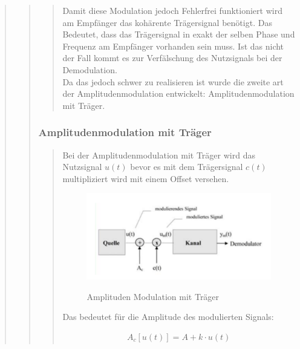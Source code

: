 \begin{quote}
\begin{quote}
\begin{quote}
             Damit diese Modulation jedoch Fehlerfrei funktioniert wird am Empfänger das kohärente Trägersignal
             benötigt. Das Bedeutet, dass das Trägersignal in exakt der selben Phase und Frequenz am Empfänger vorhanden
             sein muss. Ist das nicht der Fall kommt es zur Verfälschung des Nutzsignals bei der Demodulation.\\
             Da das jedoch schwer zu realisieren ist wurde die zweite art der Amplitudenmodulation entwickelt:
             Amplitudenmodulation mit Träger.
             
            
		\end{quote}
		
		\subsubsection{Amplitudenmodulation mit Träger}
		\begin{quote}
			Bei der Amplitudenmodulation mit Träger wird das Nutzsignal $u(t)$ bevor es mit dem Trägersignal $c(t)$
			multipliziert wird mit einem Offset versehen.
			
			\begin{figure}[H]
            \centering
                \includegraphics[scale=0.7, trim = 0cm 0cm 0cm 0cm, clip]{./Bilder/AMmitTraeger}
                    \caption{Amplituden Modulation mit Träger}
                    \cite{AMmitUeber}
            \end{figure}
            
            Das bedeutet für die Amplitude des modulierten Signals:
            
            \begin{equation*}
                \begin{split}
                    A_c [u(t)] = A + k \cdot u(t)
                \end{split}
            \end{equation*}
            

\end{quote}
\end{quote}
\end{quote}
